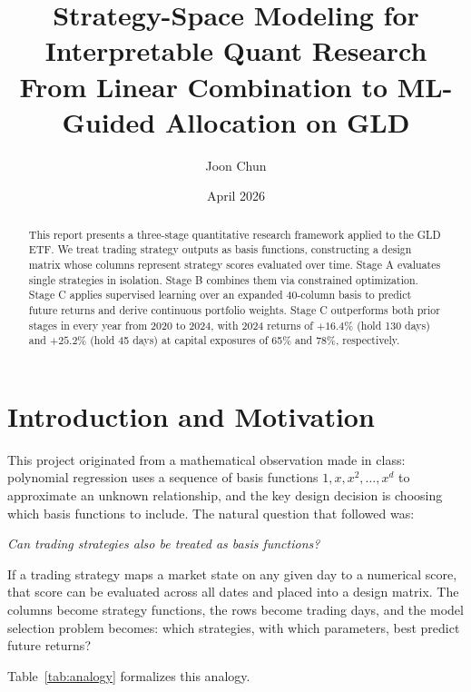 \documentclass[11pt, letterpaper]{article}
\title{\textbf{Strategy-Space Modeling for Interpretable Quant Research}\\[0.4em]
\large From Linear Combination to ML-Guided Allocation on GLD}
\author{Joon Chun}
\date{April 2026}
\begin{document}
\maketitle
\thispagestyle{empty}

\begin{abstract}
This report presents a three-stage quantitative research framework applied to the
GLD ETF. We treat trading strategy outputs as basis functions, constructing a
design matrix whose columns represent strategy scores evaluated over time. Stage A
evaluates single strategies in isolation. Stage B combines them via constrained
optimization. Stage C applies supervised learning over an expanded 40-column
basis to predict future returns and derive continuous portfolio weights. Stage C
outperforms both prior stages in every year from 2020 to 2024, with 2024 returns
of $+16.4\%$ (hold 130 days) and $+25.2\%$ (hold 45 days) at capital exposures
of 65\% and 78\%, respectively.
\end{abstract}

\newpage
\setcounter{page}{1}

\section{Introduction and Motivation}

This project originated from a mathematical observation made in class: polynomial
regression uses a sequence of basis functions $1, x, x^2, \ldots, x^d$ to
approximate an unknown relationship, and the key design decision is choosing which
basis functions to include. The natural question that followed was:

\begin{center}
\textit{Can trading strategies also be treated as basis functions?}
\end{center}

If a trading strategy maps a market state on any given day to a numerical score,
that score can be evaluated across all dates and placed into a design matrix. The
columns become strategy functions, the rows become trading days, and the model
selection problem becomes: which strategies, with which parameters, best predict
future returns?

Table~\ref{tab:analogy} formalizes this analogy.
\end{document}

